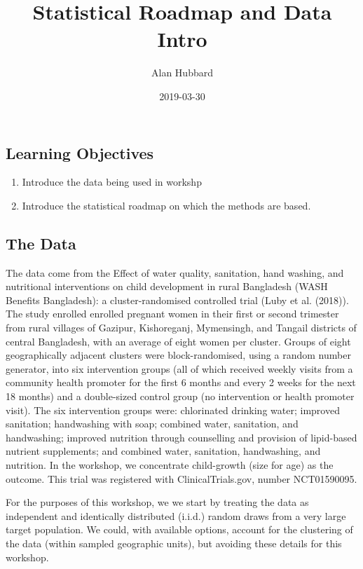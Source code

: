 \documentclass[]{article}
\title{Statistical Roadmap and Data Intro}
\author{Alan Hubbard}
\date{2019-03-30}
\providecommand{\tightlist}{%
  \setlength{\itemsep}{0pt}\setlength{\parskip}{0pt}}
\begin{document}
\maketitle

\hypertarget{learning-objectives}{%
\subsection{Learning Objectives}\label{learning-objectives}}

\begin{enumerate}
\def\labelenumi{\arabic{enumi}.}
\tightlist
\item
  Introduce the data being used in workshp
\item
  Introduce the statistical roadmap on which the methods are based.
\end{enumerate}

\hypertarget{the-data}{%
\subsection{The Data}\label{the-data}}

The data come from the Effect of water quality, sanitation, hand
washing, and nutritional interventions on child development in rural
Bangladesh (WASH Benefits Bangladesh): a cluster-randomised controlled
trial (Luby et al. (2018)). The study enrolled enrolled pregnant women
in their first or second trimester from rural villages of Gazipur,
Kishoreganj, Mymensingh, and Tangail districts of central Bangladesh,
with an average of eight women per cluster. Groups of eight
geographically adjacent clusters were block-randomised, using a random
number generator, into six intervention groups (all of which received
weekly visits from a community health promoter for the first 6 months
and every 2 weeks for the next 18 months) and a double-sized control
group (no intervention or health promoter visit). The six intervention
groups were: chlorinated drinking water; improved sanitation;
handwashing with soap; combined water, sanitation, and handwashing;
improved nutrition through counselling and provision of lipid-based
nutrient supplements; and combined water, sanitation, handwashing, and
nutrition. In the workshop, we concentrate child-growth (size for age)
as the outcome. This trial was registered with ClinicalTrials.gov,
number NCT01590095.

For the purposes of this workshop, we we start by treating the data as
independent and identically distributed (i.i.d.) random draws from a
very large target population. We could, with available options, account
for the clustering of the data (within sampled geographic units), but
avoiding these details for this workshop.
\end{document}
